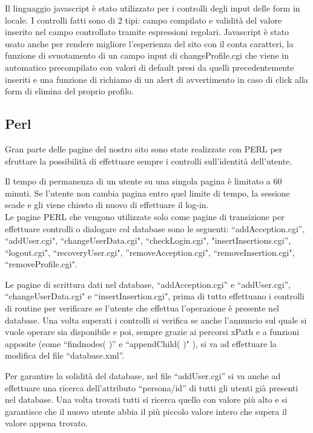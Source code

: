 \documentclass[12pt]{article}
\begin{document}
	Il linguaggio javascript è stato utilizzato per i controlli degli input delle form in locale.
	I controlli fatti sono di 2 tipi: campo compilato e validità del valore inserito nel campo controllato tramite espressioni regolari.
	Javascript è stato usato anche per rendere migliore l'esperienza del sito con il conta caratteri, la funzione di svuotamento di un campo input di changeProfile.cgi che viene in automatico precompilato con valori di default presi da quelli precedentemente inseriti e una funzione di richiamo di un alert di avvertimento in caso di click alla form di elimina del proprio profilo.
	
	\subsection{Perl}
	
	Gran parte delle pagine del nostro sito sono state realizzate con PERL per sfruttare la possibilità di effettuare sempre i controlli sull’identità dell’utente.
	
	Il tempo di permanenza di un utente su una singola pagina è limitato a 60 minuti. Se l’utente non cambia pagina entro quel limite di tempo, la sessione scade e gli viene chiesto di nuovo di effettuare il log-in. \\	
	Le pagine PERL che vengono utilizzate solo come pagine di transizione per effettuare controlli o dialogare col database sono le seguenti:	
	“addAcception.cgi”, “addUser.cgi", “changeUserData.cgi", “checkLogin.cgi", "insertInsertions.cgi'', “logout.cgi", “recoveryUser.cgi", ''removeAcception.cgi", “removeInsertion.cgi", “removeProfile.cgi".
	
Le pagine di scrittura dati nel database, “addAcception.cgi” e “addUser.cgi”, “changeUserData.cgi" e “insertInsertion.cgi", prima di tutto effettuano i controlli di routine per verificare se l’utente che effettua l’operazione è presente nel database. Una volta superati i controlli si verifica se anche l’annuncio sul quale si vuole operare sia disponibile e poi, sempre grazie ai percorsi xPath e a funzioni apposite (come “findnodes( )” e “appendChild( )" ), si va ad effettuare la modifica del file “database.xml”.

Per garantire la solidità del database, nel file “addUser.cgi” si va anche ad effettuare una ricerca dell'attributo “persona/id” di tutti gli utenti già presenti nel database. Una volta trovati tutti si ricerca quello con valore più alto e si garantisce che il nuovo utente abbia il più piccolo valore intero che supera il valore appena trovato.
\end{document}
